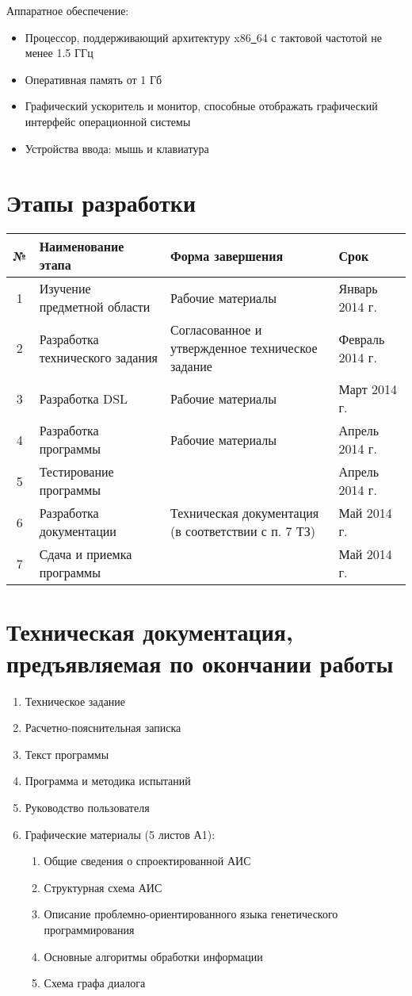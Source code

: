 \documentclass[russian,utf8,emptystyle]{eskdtext}
\begin{document}
Аппаратное обеспечение:
\begin{itemize}
\item Процессор, поддерживающий архитектуру x86\underline{~}64 с тактовой частотой не менее 1.5 ГГц
\item Оперативная память от 1 Гб
\item Графический ускоритель и монитор, способные отображать графический интерфейс операционной системы
\item Устройства ввода: мышь и клавиатура
\end{itemize}

\section{Этапы разработки}
\begin{center}
\begin{tabularx}{\textwidth}{c|X|X|X}
№ & Наименование этапа & Форма завершения & Срок \\ 
\hline 
1 & Изучение предметной области & Рабочие материалы & Январь 2014 г. \\ 
\hline 
2 & Разработка технического задания & Согласованное и утвержденное техническое задание & Февраль 2014 г. \\ 
\hline 
3 & Разработка DSL & Рабочие материалы & Март 2014 г. \\ 
\hline 
4 & Разработка программы & Рабочие материалы & Апрель 2014 г. \\ 
\hline 
5 & Тестирование программы &   & Апрель 2014 г. \\ 
\hline 
6 & Разработка документации & Техническая документация (в соответствии с п. 7 ТЗ) & Май 2014 г. \\ 
\hline 
7 & Сдача и приемка программы &   & Май 2014 г. \\
\end{tabularx} 
\end{center}

\section{Техническая документация, предъявляемая по окончании работы}
\begin{enumerate}
\item Техническое задание
\item Расчетно-пояснительная записка
\item Текст программы
\item Программа и методика испытаний
\item Руководство пользователя
\item Графические материалы (5 листов А1):
\begin{enumerate}
\item Общие сведения о спроектированной АИС
\item Структурная схема АИС
\item Описание проблемно-ориентированного языка генетического программирования
\item Основные алгоритмы обработки информации
\item Схема графа диалога
\end{enumerate}
\end{enumerate}
\end{document}
